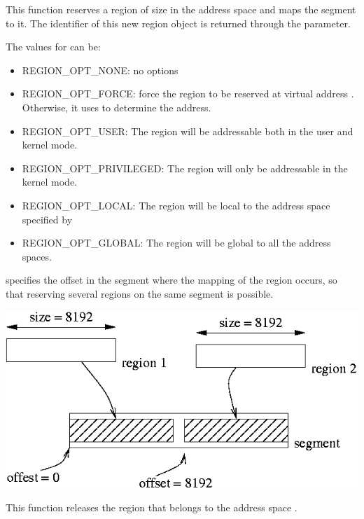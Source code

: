 {
  This function reserves a region of size  in the address space
   and maps the segment  to it. The identifier
  of this new region object is returned through the  parameter.
  
  \-
  
  The values for  can be:
  \begin{itemize}
    \item REGION\_OPT\_NONE: no options
    \item REGION\_OPT\_FORCE: force the region to be reserved at virtual
      address . Otherwise, it uses  to
      determine the address.
    \item REGION\_OPT\_USER: The region will be addressable both in the user
      and kernel mode.
    \item REGION\_OPT\_PRIVILEGED: The region will only be addressable in the
      kernel mode.
    \item REGION\_OPT\_LOCAL: The region will be local to the address space
      specified by 
    \item REGION\_OPT\_GLOBAL: The region will be global to all the address
      spaces.
  \end{itemize}
   specifies the offset in the segment where the mapping of the region occurs, so that reserving several regions on the same segment is possible.
  \begin{center}
    \includegraphics[width=0.4\linewidth]{figures/k1-offset}
  \end{center}

}

{
  This function releases the region  that belongs to the
  address space .
}

